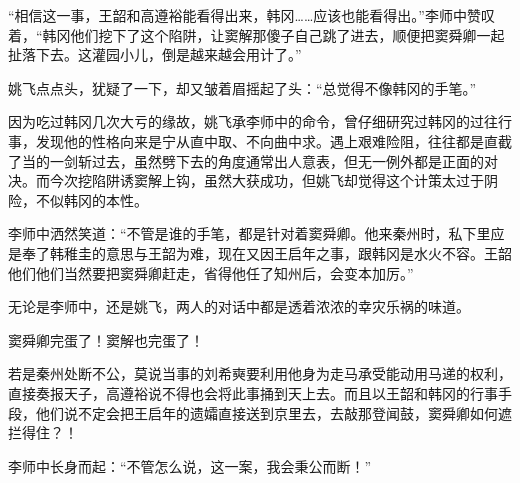“相信这一事，王韶和高遵裕能看得出来，韩冈……应该也能看得出。”李师中赞叹着，“韩冈他们挖下了这个陷阱，让窦解那傻子自己跳了进去，顺便把窦舜卿一起扯落下去。这灌园小儿，倒是越来越会用计了。”

姚飞点点头，犹疑了一下，却又皱着眉摇起了头：“总觉得不像韩冈的手笔。”

因为吃过韩冈几次大亏的缘故，姚飞承李师中的命令，曾仔细研究过韩冈的过往行事，发现他的性格向来是宁从直中取、不向曲中求。遇上艰难险阻，往往都是直截了当的一剑斩过去，虽然劈下去的角度通常出人意表，但无一例外都是正面的对决。而今次挖陷阱诱窦解上钩，虽然大获成功，但姚飞却觉得这个计策太过于阴险，不似韩冈的本性。

李师中洒然笑道：“不管是谁的手笔，都是针对着窦舜卿。他来秦州时，私下里应是奉了韩稚圭的意思与王韶为难，现在又因王启年之事，跟韩冈是水火不容。王韶他们他们当然要把窦舜卿赶走，省得他任了知州后，会变本加厉。”

无论是李师中，还是姚飞，两人的对话中都是透着浓浓的幸灾乐祸的味道。

窦舜卿完蛋了！窦解也完蛋了！

若是秦州处断不公，莫说当事的刘希奭要利用他身为走马承受能动用马递的权利，直接奏报天子，高遵裕说不得也会将此事捅到天上去。而且以王韶和韩冈的行事手段，他们说不定会把王启年的遗孀直接送到京里去，去敲那登闻鼓，窦舜卿如何遮拦得住？！

李师中长身而起：“不管怎么说，这一案，我会秉公而断！”

